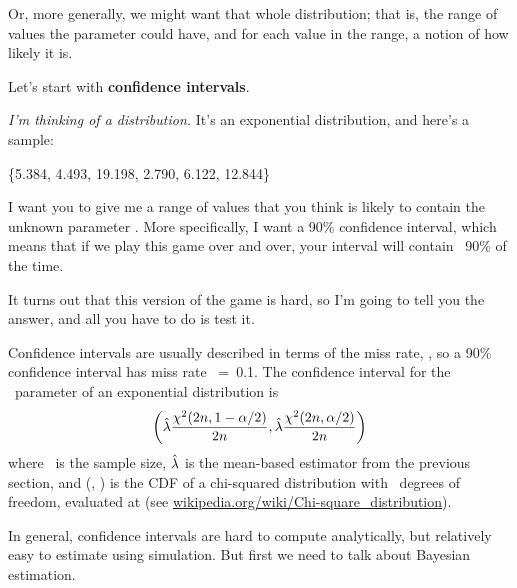 \documentclass[12pt]{book}
\begin{document}
Or, more generally, we might want that whole distribution; that is,
the range of values the parameter could have, and for each value in
the range, a notion of how likely it is.

Let's start with {\bf confidence intervals}.

{\em I'm thinking of a distribution.}  It's an exponential distribution, and 
here's a sample:

\{5.384, 4.493, 19.198, 2.790, 6.122, 12.844\}

I want you to give me a range of values that you think is likely to
contain the unknown parameter \mylambda.  More specifically, I want
a 90\% confidence interval, which means that if we play this game over
and over, your interval will contain \mylambda~90\% of the time.

It turns out that this version of the game is hard, so I'm going
to tell you the answer, and all you have to do is test it.

Confidence intervals are usually described in terms of the miss rate,
\myalpha, so a 90\% confidence interval has miss rate \myalpha~=~0.1.
The confidence interval for the \mylambda~parameter of an exponential
distribution is
%
\[ \left( \hat{\lambda} \frac{\chi^2(2n, 1-\alpha/2)}{2n},
      \hat{\lambda} \frac{\chi^2(2n, \alpha/2)}{2n} \right) \]
%
where \n~is the sample size, $\hat{\lambda}$ is the mean-based estimator
from the previous section, and \mychi{}(\kk, \x) is the CDF of a
chi-squared distribution with \kk~degrees of freedom, evaluated at \x
(see \url{wikipedia.org/wiki/Chi-square_distribution}).

In general, confidence intervals are hard to compute analytically, but
relatively easy to estimate using simulation.  But first we need
to talk about Bayesian estimation.





\end{document}
